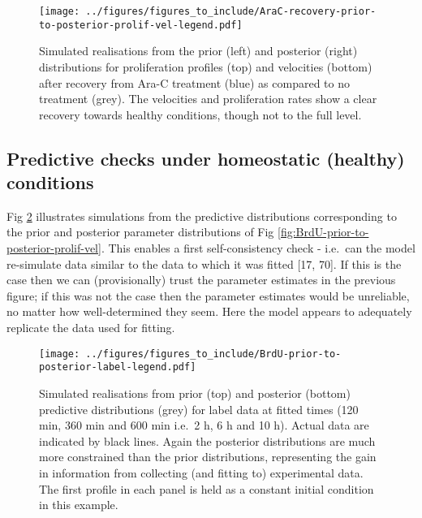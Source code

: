 \documentclass[10pt,letterpaper]{article}
\begin{document}
\begin{figure}
\centering
\texttt{[image: ../figures/figures\_to\_include/AraC-recovery-prior-to-posterior-prolif-vel-legend.pdf]}
\caption{Simulated realisations from the prior (left) and posterior
(right) distributions for proliferation profiles (top) and velocities
(bottom) after recovery from Ara-C treatment (blue) as compared to no
treatment (grey). The velocities and proliferation rates show a clear
recovery towards healthy conditions, though not to the full
level.\label{fig:AraC-recovery-prior-to-posterior-prolif-vel}}
\end{figure}

\subsection{Predictive checks under homeostatic (healthy)
conditions}\label{predictive-checks-under-homeostatic-healthy-conditions}

Fig \ref{fig:BrdU-prior-to-posterior-label} illustrates simulations from
the predictive distributions corresponding to the prior and posterior
parameter distributions of Fig
\ref{fig:BrdU-prior-to-posterior-prolif-vel}. This enables a first
self-consistency check - i.e.~can the model re-simulate data similar to
the data to which it was fitted {[}17, 70{]}. If this is the case then
we can (provisionally) trust the parameter estimates in the previous
figure; if this was not the case then the parameter estimates would be
unreliable, no matter how well-determined they seem. Here the model
appears to adequately replicate the data used for fitting.

\begin{figure}
\centering
\texttt{[image: ../figures/figures\_to\_include/BrdU-prior-to-posterior-label-legend.pdf]}
\caption{Simulated realisations from prior (top) and posterior (bottom)
predictive distributions (grey) for label data at fitted times (120 min,
360 min and 600 min i.e.~2 h, 6 h and 10 h). Actual data are indicated
by black lines. Again the posterior distributions are much more
constrained than the prior distributions, representing the gain in
information from collecting (and fitting to) experimental data. The
first profile in each panel is held as a constant initial condition in
this example.\label{fig:BrdU-prior-to-posterior-label}}
\end{figure}
\end{document}
